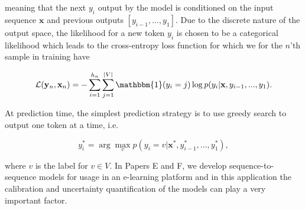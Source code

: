 \noindent meaning that the next $y_i$ output by the model is conditioned on the input sequence $\mathbf{x}$ and previous outputs $[y_{i-1},...,y_{1}]$. Due to the discrete nature of the output space, the likelihood for a new token $y_i$ is chosen to be a categorical likelihood which leads to the cross-entropy loss function for which we for the $n$'th sample in training have

\begin{equation}
    \mathcal{L}(\mathbf{y}_n, \mathbf{x}_n) = - \sum_{i=1}^{h_n}\sum_{j=1}^{|V|}\mathbbm{1}(y_i=j)\log p(y_i|\mathbf{x}, y_{i-1},...,y_{1}).
\end{equation}

\noindent At prediction time, the simplest prediction strategy is to use greedy search to output one token at a time, i.e. 

\begin{equation}
    y^*_i = \arg\max_vp(y_i=v|\mathbf{x}^*, y^*_{i-1},...,y^*_{1}),
\end{equation}

\noindent where $v$ is the label for $v \in V$. In Papers E and F, we develop sequence-to-sequence models for usage in an e-learning platform and in this application the calibration and uncertainty quantification of the models can play a very important factor.









